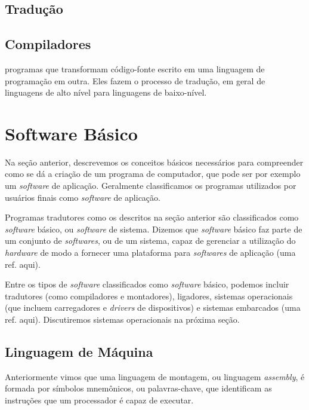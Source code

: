 \subsection{Tradução}




\subsection{Compiladores}

programas que transformam código-fonte escrito em uma linguagem de programação
em outra. Eles fazem o processo de tradução, em geral de linguagens de alto
nível para linguagens de baixo-nível.

\section{Software Básico}

Na seção anterior, descrevemos os conceitos básicos necessários para compreender
como se dá a criação de um programa de computador, que pode ser por exemplo um
\textit{software} de aplicação. Geralmente classificamos os programas utilizados
por usuários finais como \textit{software} de aplicação.

Programas tradutores como os descritos na seção anterior são classificados como
\textit{software} básico, ou \textit{software} de sistema. Dizemos que
\textit{software} básico faz parte de um conjunto de \textit{softwares}, ou de
um sistema, capaz de gerenciar a utilização do \textit{hardware} de modo a
fornecer uma plataforma para \textit{softwares} de aplicação (uma ref. aqui).

Entre os tipos de \textit{software} classificados como \textit{software} básico,
podemos incluir tradutores (como compiladores e montadores), ligadores, sistemas
operacionais (que incluem carregadores e \textit{drivers} de dispositivos) e
sistemas embarcados (uma ref. aqui). Discutiremos sistemas operacionais na
próxima seção.

\subsection{Linguagem de Máquina}
\label{subsec:linguagem_maquina}

Anteriormente vimos que uma linguagem de montagem, ou linguagem
\textit{assembly}, é formada por símbolos mnemônicos, ou palavras-chave, que
identificam as instruções que um processador é capaz de executar.

